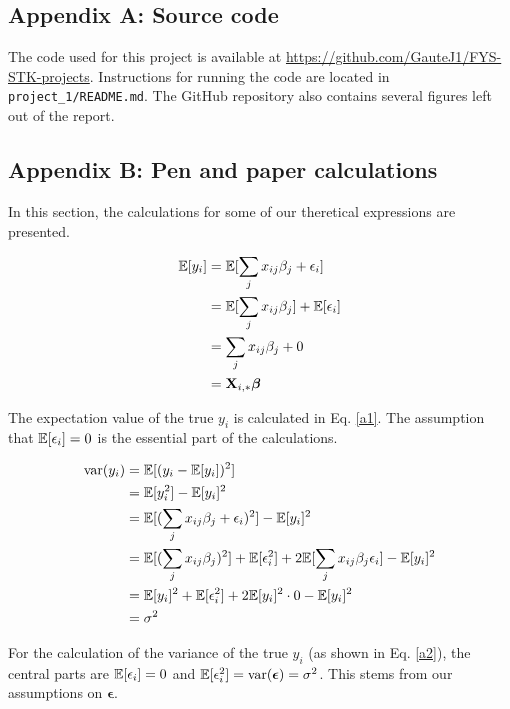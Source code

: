 \subsection{Appendix A: Source code} \label{appendixA}
The code used for this project is available at \url{https://github.com/GauteJ1/FYS-STK-projects}. Instructions for running the code are located in \texttt{ project\_1/README.md}. The GitHub repository also contains several figures left out of the report. 


\subsection{Appendix B: Pen and paper calculations}\label{appendixB}

In this section, the calculations for some of our theretical expressions are presented. 

\begin{align}\label{a1}
    \mathbb{E}[y_i] & = \mathbb{E}[\sum_j x_{ij}\beta_j + \epsilon_i] \nonumber \\
    & = \mathbb{E}[\sum_j x_{ij}\beta_j] + \mathbb{E}[\epsilon_i] \nonumber \\ 
    & = \sum_j x_{ij}\beta_j + 0 \nonumber \\
    & = \mathbf{X}_{i,*}\boldsymbol{\beta}
\end{align}

The expectation value of the true $y_i$ is calculated in Eq. \ref{a1}. The assumption that $\mathbb{E}[\epsilon_i] = 0$ is the essential part of the calculations. 



\begin{align}\label{a2}
    \text{var}(y_i) & = \mathbb{E}[(y_i -\mathbb{E}[y_i])^2] \nonumber \\
    & = \mathbb{E}[y_i^2] - \mathbb{E}[y_i]^2 \nonumber \\ 
    & = \mathbb{E}[(\sum_j x_{ij}\beta_j + \epsilon_i)^2] - \mathbb{E}[y_i]^2 \nonumber \\
    & = \mathbb{E}[(\sum_j x_{ij}\beta_j)^2] + \mathbb{E}[\epsilon_i^2] + 2\mathbb{E}[\sum_j x_{ij}\beta_j \epsilon_i ] - \mathbb{E}[y_i]^2 \nonumber \\
    & = \mathbb{E}[y_i]^2 + \mathbb{E}[\epsilon_i^2] + 2\mathbb{E}[y_i]^2\cdot 0 - \mathbb{E}[y_i]^2 \nonumber \\ 
    & = \sigma^2
\end{align}

For the calculation of the variance of the true $y_i$ (as shown in Eq. \ref{a2}), the central parts are $\mathbb{E}[\epsilon_i] = 0$ and $\mathbb{E}[\epsilon_i^2] = \text{var}(\boldsymbol{\epsilon}) = \sigma^2$. This stems from our assumptions on $\boldsymbol{\epsilon}$. 

